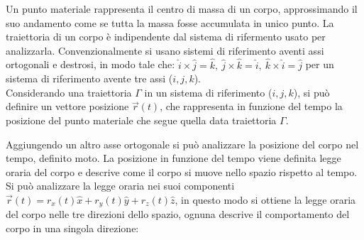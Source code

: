 \documentclass{article}
\numberwithin{equation}{subsection}
\begin{document}
Un punto materiale rappresenta il centro di massa di un corpo, approssimando
il suo andamento come se tutta la massa fosse accumulata in unico punto.
La traiettoria di un corpo è indipendente dal sistema di rifermento usato
per analizzarla. Convenzionalmente si usano sistemi di riferimento aventi
assi ortogonali e destrosi, in modo tale che: $\hat{i}\times\hat{j} = \hat{k},\: 
\hat{j}\times\hat{k} = \hat{i},\: \hat{k}\times\hat{i} = \hat{j}$ per un sistema di 
riferimento avente tre assi ($i, j, k$).\\

Considerando una traiettoria $\Gamma$ in un sistema di riferimento ($i,j,k$),
si può definire un vettore posizione $\vec{r}(t)$, che rappresenta in 
funzione del tempo la posizione del punto materiale che segue quella data
traiettoria $\Gamma$.

\begin{center}\end{center}

Aggiungendo un altro asse ortogonale si può analizzare la posizione 
del corpo nel tempo, definito moto. La posizione in 
funzione del tempo viene definita legge oraria del corpo 
e descrive come il corpo si muove nello spazio rispetto al tempo. 
Si può analizzare la legge oraria nei suoi componenti 
$\vec{r}(t) = r_x(t)\hat{x} + r_y(t)\hat{y} + r_z(t)\hat{z}$, 
in questo modo si ottiene la legge oraria del corpo nelle 
tre direzioni dello spazio, ognuna descrive il comportamento del 
corpo in una singola direzione:
\end{document}
